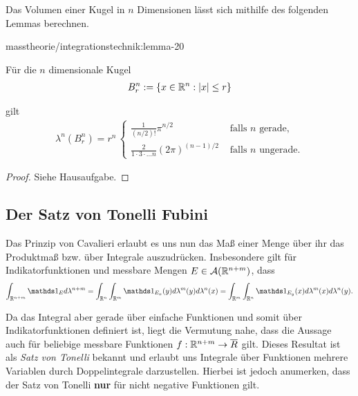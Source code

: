 \par
Das Volumen einer Kugel in \(n\) Dimensionen lässt sich mithilfe des folgenden Lemmas berechnen.
\begin{lemma}{}{masstheorie/integrationstechnik:lemma-20}



\par
Für die \(n\) dimensionale Kugel
\begin{align*}
B_r^n:=\{x\in\mathbb{R}^n: |x|\leq r\}
\end{align*}
\par
gilt
\begin{align*}
\lambda^n(B_r^n) =
r^n\,
\begin{cases}
\frac{1}{(n/2)!} \pi^{n/2}&\text{ falls }n \text{ gerade,}\\
\frac{2}{1\cdot 3\cdot\ldots n} (2\pi)^{(n-1)/2}&\text{ falls }n \text{ ungerade.}
\end{cases}
\end{align*}\end{lemma}

\begin{proof}
 Siehe Hausaufgabe.
\end{proof}


\subsection{Der Satz von Tonelli Fubini}
\label{\detokenize{masstheorie/integrationstechnik:der-satz-von-tonelli-fubini}}
\par
Das Prinzip von Cavalieri erlaubt es uns nun das Maß einer Menge über ihr das Produktmaß bzw. über Integrale auszudrücken. Insbesondere gilt für Indikatorfunktionen und messbare Mengen \(E\in\mathcal{A}(\mathbb{R}^{n+m})\), dass
\begin{align*}
\int_{\R^{n+m}} \bone_E d\lambda^{n+m} = \int_{\R^{n}} \int_{\R^{m}} \bone_{E_x}(y) d\lambda^m(y)d\lambda^n(x) =
\int_{\R^{m}} \int_{\R^{n}} \bone_{E_y}(x) d\lambda^m(x)d\lambda^n(y).
\end{align*}
\par
Da das Integral aber gerade über einfache Funktionen und somit über Indikatorfunktionen definiert ist, liegt die Vermutung nahe, dass die Aussage auch für beliebige messbare Funktionen \(f:\mathbb{R}^{n+m}\to\overline{R}\) gilt. Dieses Resultat ist als \emph{Satz von Tonelli} bekannt und erlaubt uns Integrale über Funktionen mehrere Variablen durch Doppelintegrale darzustellen. Hierbei ist jedoch anumerken, dass der Satz von Tonelli \textbf{nur} für nicht negative Funktionen gilt.

